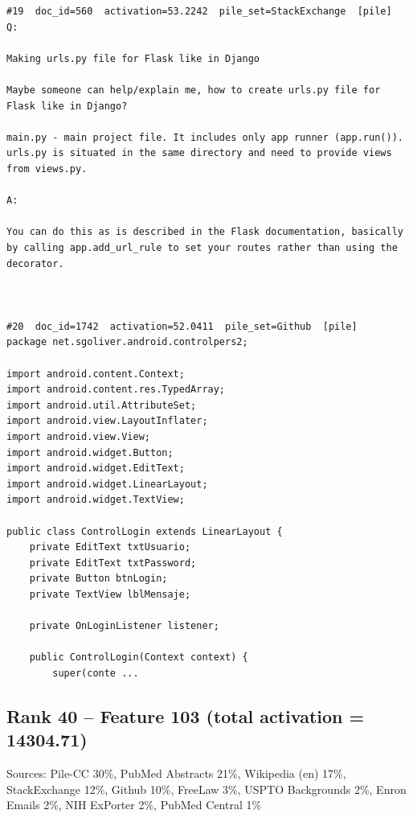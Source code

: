 \begin{verbatim}
#19  doc_id=560  activation=53.2242  pile_set=StackExchange  [pile]
Q:

Making urls.py file for Flask like in Django

Maybe someone can help/explain me, how to create urls.py file for Flask like in Django?

main.py - main project file. It includes only app runner (app.run()).
urls.py is situated in the same directory and need to provide views
from views.py.

A:

You can do this as is described in the Flask documentation, basically by calling app.add_url_rule to set your routes rather than using the decorator.



#20  doc_id=1742  activation=52.0411  pile_set=Github  [pile]
package net.sgoliver.android.controlpers2;

import android.content.Context;
import android.content.res.TypedArray;
import android.util.AttributeSet;
import android.view.LayoutInflater;
import android.view.View;
import android.widget.Button;
import android.widget.EditText;
import android.widget.LinearLayout;
import android.widget.TextView;

public class ControlLogin extends LinearLayout {
	private EditText txtUsuario;
	private EditText txtPassword;
	private Button btnLogin;
	private TextView lblMensaje;
	
	private OnLoginListener listener;
	
	public ControlLogin(Context context) {
		super(conte ...

\end{verbatim}

\subsection*{Rank 40 -- Feature 103 (total activation = 14304.71)}

Sources: Pile-CC 30\%, PubMed Abstracts 21\%, Wikipedia (en) 17\%, StackExchange 12\%, Github 10\%, FreeLaw 3\%, USPTO Backgrounds 2\%, Enron Emails 2\%, NIH ExPorter 2\%, PubMed Central 1\%

